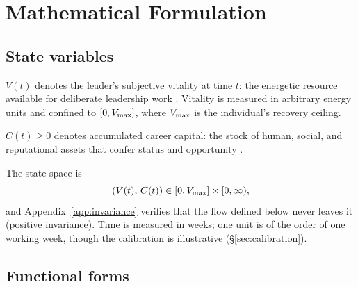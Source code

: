%
\section{Mathematical Formulation}
\label{sec:formulation}

\subsection{State variables}
\label{sec:state}

\begin{definition}
\label{def:vitality}
$V(t)$ denotes the leader's subjective vitality at time $t$: the energetic
resource available for deliberate leadership work
\citep{ryan1997subjective,meijman1998effort}. Vitality is measured in
arbitrary energy units and confined to $[0,V_{\max}]$, where $V_{\max}$ is the
individual's recovery ceiling.
\end{definition}

\begin{definition}
\label{def:capital}
$C(t)\ge 0$ denotes accumulated career capital: the stock of human, social,
and reputational assets that confer status and opportunity
\citep{becker1993human}.
\end{definition}

The state space is
\begin{equation}
\label{eq:statespace}
(V(t),\,C(t)) \in [0,V_{\max}]\times[0,\infty),
\end{equation}
and Appendix~\ref{app:invariance} verifies that the flow defined below never
leaves it (positive invariance). Time is measured in weeks; one unit is of
the order of one working week, though the calibration is illustrative
(\S\ref{sec:calibration}).

\subsection{Functional forms}
\label{sec:forms}


